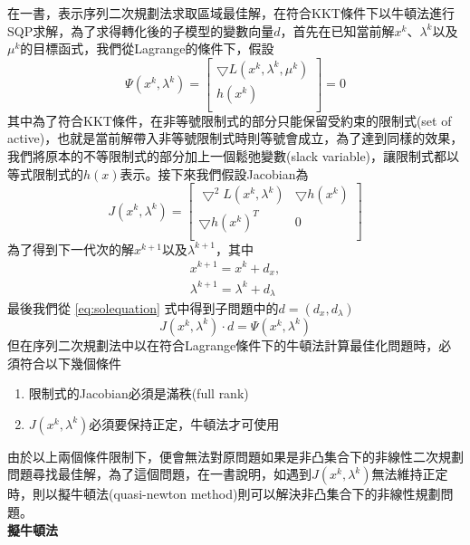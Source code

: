 在\cite{Nocedal.etc}一書，表示序列二次規劃法求取區域最佳解，在符合KKT條件下以牛頓法進行SQP求解，為了求得轉化後的子模型的變數向量$d$，首先在已知當前解$x^{k}$、$\lambda^k$以及$\mu^{k}$的目標函式，我們從Lagrange的條件下，假設\\
\begin{equation*}
	\Psi(x^{k},\lambda^{k})= \left[ 
	\begin{array}{c} 
		\bigtriangledown L(x^{k},\lambda^{k},\mu^{k}) \\
		h(x^{k}) \\
	\end{array}
	\right]=0
\end{equation*}
其中為了符合KKT條件，在非等號限制式的部分只能保留受約束的限制式(set of active)，也就是當前解帶入非等號限制式時則等號會成立，為了達到同樣的效果，我們將原本的不等限制式的部分加上一個鬆弛變數(slack variable)，讓限制式都以等式限制式的$h(x)$表示。接下來我們假設Jacobian為
\begin{equation*}
	J(x^{k},\lambda^{k})= \left[ 
	\begin{array}{cc} 
		\bigtriangledown^{2} L(x^{k},\lambda^{k}) & \bigtriangledown h(x^{k})\\
		\bigtriangledown h(x^{k})^{T} & 0 \\
	\end{array}
	\right]
\end{equation*}
為了得到下一代次的解$x^{k+1}$以及$\lambda^{k+1}$，其中
\begin{equation*}
	\begin{array}{c}
	x^{k+1}=x^{k}+d_x,\\
	\lambda^{k+1}=\lambda^{k}+d_{\lambda}
	\end{array}
\end{equation*}
最後我們從 \ref{eq:solequation} 式中得到子問題中的$d=(d_x,d_{\lambda})$
\begin{equation}
J(x^{k},\lambda^{k})\cdot d =\Psi(x^{k},\lambda^{k})
\label{eq:solequation}
\end{equation}
但在序列二次規劃法中以在符合Lagrange條件下的牛頓法計算最佳化問題時，必須符合以下幾個條件
\begin{enumerate}[(1)]
	\item 限制式的Jacobian必須是滿秩(full rank)
	\item $J(x^{k},\lambda^{k})$必須要保持正定，牛頓法才可使用
\end{enumerate}
由於以上兩個條件限制下，便會無法對原問題如果是非凸集合下的非線性二次規劃問題尋找最佳解，為了這個問題，在\cite{Nocedal.etc}一書說明，如遇到$J(x^{k},\lambda^{k})$無法維持正定時，則以擬牛頓法(quasi-newton method)則可以解決非凸集合下的非線性規劃問題。
\\ \textbf{擬牛頓法}

